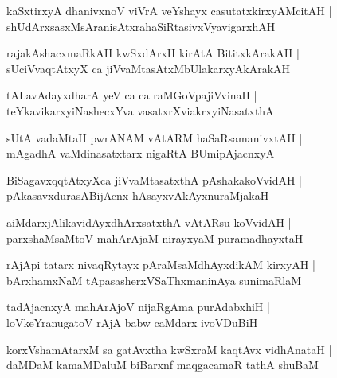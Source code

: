\documentclass[twoside,12pt,openright]{book}
\newcounter{shloka}[chapter]
\begin{document}
\begin{shloka}%
kaSxtirxyA dhanivxnoV viVrA veYshayx casutatxkirxyAMcitAH |\\
shUdArxsasxMsAranisAtxrahaSiRtasivxVyavigarxhAH 
\end{shloka}

\begin{shloka}%
rajakAshacxmaRkAH kwSxdArxH kirAtA BititxkArakAH |\\
sUciVvaqtAtxyX ca jiVvaMtasAtxMbUlakarxyAkArakAH 
\end{shloka}

\begin{shloka}%
tALavAdayxdharA yeV ca ca raMGoVpajiVvinaH |\\
teYkavikarxyiNashecxYva vasatxrXviakrxyiNasatxthA 
\end{shloka}

\begin{shloka}%
sUtA vadaMtaH pwrANAM vAtARM haSaRsamanivxtAH |\\
mAgadhA vaMdinasatxtarx nigaRtA BUmipAjacnxyA 
\end{shloka}

\begin{shloka}%
BiSagavxqqtAtxyXca jiVvaMtasatxthA pAshakakoVvidAH |\\
pAkasavxdurasABijAcnx hAsayxvAkAyxnuraMjakaH
\end{shloka}

\begin{shloka}%
aiMdarxjAlikavidAyxdhArxsatxthA vAtARsu koVvidAH |\\
parxshaMsaMtoV mahArAjaM nirayxyaM puramadhayxtaH
\end{shloka}

\begin{shloka}%
rAjApi tatarx nivaqRytayx pAraMsaMdhAyxdikAM kirxyAH |\\
bArxhamxNaM tApasasherxVSaThxmaninAya sunimaRlaM 
\end{shloka}

\begin{shloka}%
tadAjacnxyA mahArAjoV nijaRgAma purAdabxhiH |\\
loVkeYranugatoV rAjA babw caMdarx ivoVDuBiH 
\end{shloka}

\begin{shloka}%
korxVshamAtarxM sa gatAvxtha kwSxraM kaqtAvx vidhAnataH |\\
daMDaM kamaMDaluM biBarxnf maqgacamaR tathA shuBaM
\end{shloka}
\end{document}
